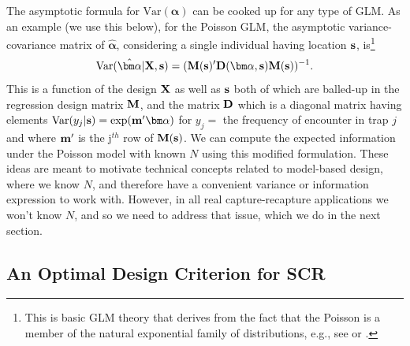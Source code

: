 The asymptotic formula for $\mbox{Var}( {\bm \alpha})$ can be cooked
up for any type of GLM. As an example (we use this below), for the
Poisson GLM, the asymptotic variance-covariance matrix of $\hat{\bm
  \alpha}$, considering a single individual having location ${\bf s}$,
is\footnote{ This is basic GLM theory that derives from the fact that
  the Poisson is a member of the natural exponential family of
  distributions, e.g., see \citet{mccullagh_nelder:1989} or
  \citet{agresti:2002}.}
\begin{equation}
  \mbox{Var}(\hat{\bm \alpha}|{\bf X},{\bf s})
=  ({\bf M}({\bf s})' {\bf D}({\bm \alpha},{\bf s}){\bf M}({\bf s}))^{-1}.
\label{eq.varalpha}
\end{equation}
This is a function of the design ${\bf X}$ as well as ${\bf s}$ both
of which are balled-up in the regression design matrix ${\bf M}$, and
the matrix ${\bf D}$ which is a diagonal matrix having elements
$\mbox{Var}( y_{j}|{\bf s}) = \exp({\bf m}'{\bm \alpha})$ for $y_{j} =$
the frequency of encounter in trap $j$ and where ${\bf m}'$ is the j$^{th}$ row
of ${\bf M}({\bf s})$. 
We can compute the expected
information under the Poisson model with known $N$ using this modified
formulation.  These ideas are meant to motivate technical concepts
related to model-based design, where we know $N$, and therefore have a
convenient variance or information expression to work with. However,
in all real capture-recapture applications we won't know $N$, and so
we need to address that issue, which we do in the next section.



\subsection{An Optimal Design Criterion for SCR}

